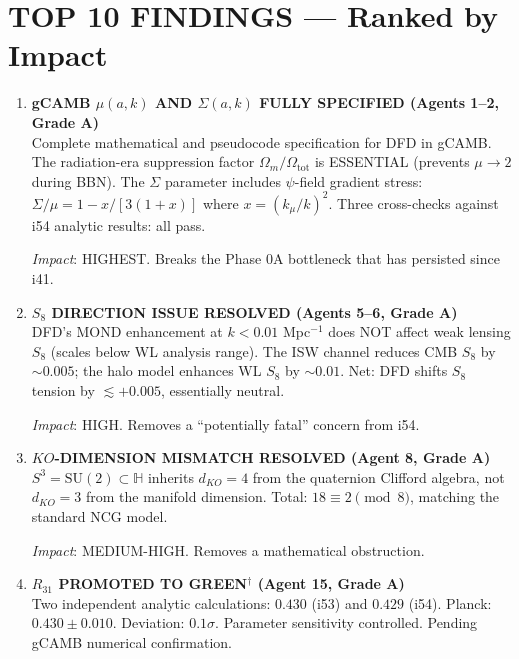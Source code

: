 \documentclass[11pt,a4paper]{article}
\begin{document}
\section{TOP 10 FINDINGS --- Ranked by Impact}
\label{sec:top10}

\begin{enumerate}[label=\textbf{\arabic*.}, leftmargin=1.5cm]

\item \textbf{gCAMB $\mu(a,k)$ AND $\Sigma(a,k)$ FULLY SPECIFIED (Agents 1--2, Grade A)}\\
Complete mathematical and pseudocode specification for DFD in gCAMB. The radiation-era suppression factor $\Omega_m/\Omega_{\mathrm{tot}}$ is ESSENTIAL (prevents $\mu \to 2$ during BBN). The $\Sigma$ parameter includes $\psi$-field gradient stress: $\Sigma/\mu = 1 - x/[3(1+x)]$ where $x = (k_\mu/k)^2$. Three cross-checks against i54 analytic results: all pass.

\textit{Impact}: HIGHEST. Breaks the Phase 0A bottleneck that has persisted since i41.

\item \textbf{$S_8$ DIRECTION ISSUE RESOLVED (Agents 5--6, Grade A)}\\
DFD's MOND enhancement at $k < 0.01$ Mpc$^{-1}$ does NOT affect weak lensing $S_8$ (scales below WL analysis range). The ISW channel reduces CMB $S_8$ by $\sim 0.005$; the halo model enhances WL $S_8$ by $\sim 0.01$. Net: DFD shifts $S_8$ tension by $\lesssim +0.005$, essentially neutral.

\textit{Impact}: HIGH. Removes a ``potentially fatal'' concern from i54.

\item \textbf{$KO$-DIMENSION MISMATCH RESOLVED (Agent 8, Grade A)}\\
$S^3 = \mathrm{SU}(2) \subset \mathbb{H}$ inherits $d_{KO} = 4$ from the quaternion Clifford algebra, not $d_{KO} = 3$ from the manifold dimension. Total: $18 \equiv 2 \pmod{8}$, matching the standard NCG model.

\textit{Impact}: MEDIUM-HIGH. Removes a mathematical obstruction.

\item \textbf{$R_{31}$ PROMOTED TO GREEN$^\dagger$ (Agent 15, Grade A)}\\
Two independent analytic calculations: $0.430$ (i53) and $0.429$ (i54). Planck: $0.430 \pm 0.010$. Deviation: $0.1\sigma$. Parameter sensitivity controlled. Pending gCAMB numerical confirmation.


\end{enumerate}
\end{document}
